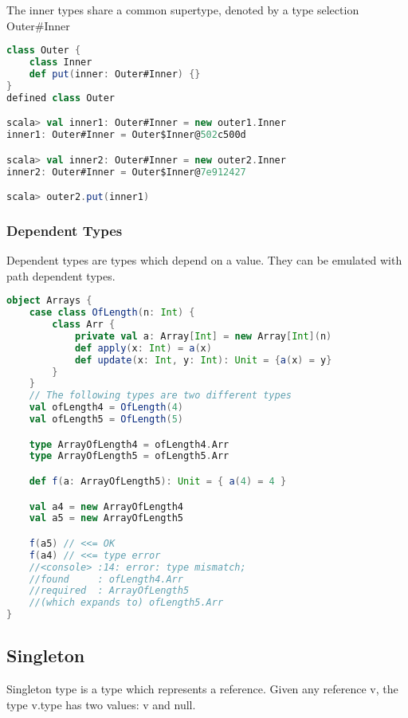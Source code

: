 The inner types share a common supertype, denoted by a type selection
Outer\#Inner

\begin{lstlisting}[language=scala,mathescape=false]
class Outer {
    class Inner
    def put(inner: Outer#Inner) {}
}
defined class Outer

scala> val inner1: Outer#Inner = new outer1.Inner
inner1: Outer#Inner = Outer$Inner@502c500d

scala> val inner2: Outer#Inner = new outer2.Inner
inner2: Outer#Inner = Outer$Inner@7e912427

scala> outer2.put(inner1)
\end{lstlisting}

\hypertarget{dependent-types}{%
\subsubsection{Dependent Types}\label{dependent-types}}

Dependent types are types which depend on a value. They can be emulated
with path dependent types.

\begin{lstlisting}[language=scala,mathescape=false]
object Arrays {
    case class OfLength(n: Int) {
        class Arr {
            private val a: Array[Int] = new Array[Int](n)
            def apply(x: Int) = a(x)
            def update(x: Int, y: Int): Unit = {a(x) = y}
        }
    }
    // The following types are two different types
    val ofLength4 = OfLength(4)
    val ofLength5 = OfLength(5)

    type ArrayOfLength4 = ofLength4.Arr
    type ArrayOfLength5 = ofLength5.Arr

    def f(a: ArrayOfLength5): Unit = { a(4) = 4 }

    val a4 = new ArrayOfLength4
    val a5 = new ArrayOfLength5

    f(a5) // <<= OK
    f(a4) // <<= type error
    //<console> :14: error: type mismatch;
    //found     : ofLength4.Arr
    //required  : ArrayOfLength5
    //(which expands to) ofLength5.Arr
}
\end{lstlisting}

\hypertarget{singleton}{%
\subsection{Singleton}\label{singleton}}

Singleton type is a type which represents a reference. Given any
reference v, the type v.type has two values: v and null.

